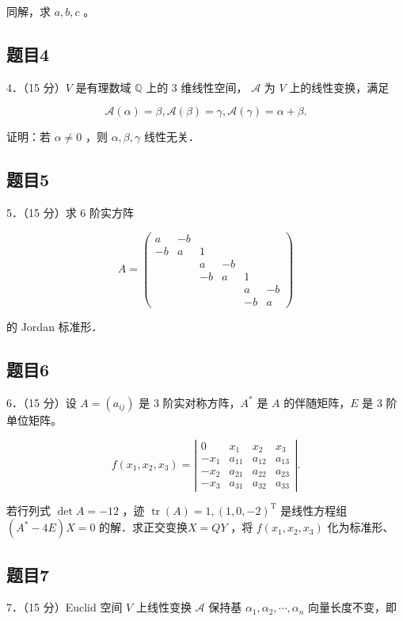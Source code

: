 \documentclass{article}
\begin{document}
同解，求 \(a, b, c\) 。

\subsection{题目4}
4．（15 分）\(V\) 是有理数域 \(\mathbb{Q}\) 上的 3 维线性空间， \(\mathcal{A}\) 为 \(V\) 上的线性变换，满足

\[
\mathcal{A}(\alpha)=\beta, \mathcal{A}(\beta)=\gamma, \mathcal{A}(\gamma)=\alpha+\beta .
\]

证明：若 \(\alpha \neq 0\) ，则 \(\alpha, \beta, \gamma\) 线性无关．

\subsection{题目5}
5．（15 分）求 6 阶实方阵

\[
A=\left(\begin{array}{cccccc}
a & -b & & & & \\
-b & a & 1 & & & \\
& & a & -b & & \\
& & -b & a & 1 & \\
& & & & a & -b \\
& & & & -b & a
\end{array}\right)
\]

的 Jordan 标准形．

\subsection{题目6}
6．（15 分）设 \(A=\left(a_{i j}\right)\) 是 3 阶实对称方阵，\(A^{*}\) 是 \(A\) 的伴随矩阵，\(E\) 是 3 阶单位矩阵。

\[
f\left(x_{1}, x_{2}, x_{3}\right)=\left|\begin{array}{cccc}
0 & x_{1} & x_{2} & x_{3} \\
-x_{1} & a_{11} & a_{12} & a_{13} \\
-x_{2} & a_{21} & a_{22} & a_{23} \\
-x_{3} & a_{31} & a_{32} & a_{33}
\end{array}\right| .
\]

若行列式 \(\operatorname{det} A=-12\) ，迹 \(\operatorname{tr}(A)=1,(1,0,-2)^{\mathrm{T}}\) 是线性方程组 \(\left(A^{*}-4 E\right) X=0\) 的解．求正交变换\(X=Q Y\) ，将 \(f\left(x_{1}, x_{2}, x_{3}\right)\) 化为标准形、

\subsection{题目7}
7．（15 分）Euclid 空间 \(V\) 上线性变换 \(\mathcal{A}\) 保持基 \(\alpha_{1}, \alpha_{2}, \cdots, \alpha_{n}\) 向量长度不变，即
\end{document}
